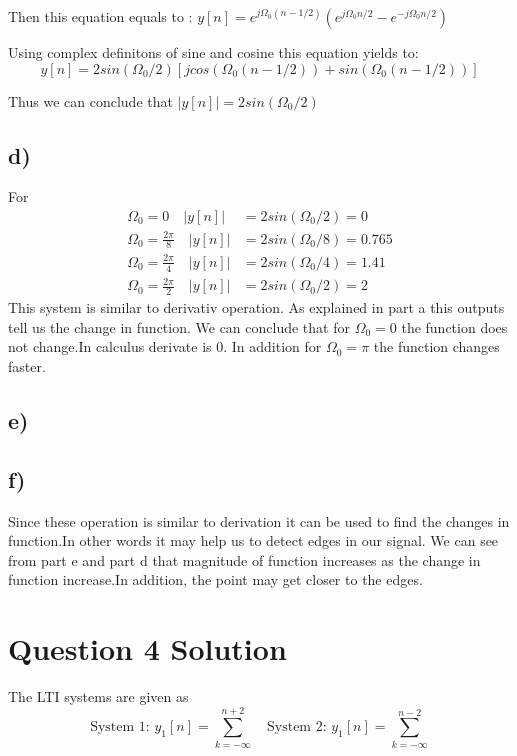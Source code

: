 \documentclass[letterpaper,12pt]{article}
\begin{document}
 Then this equation equals to : \(y[n]= e^{j \Omega_0 (n-1/2)}(e^{j \Omega_0 n/2}-e^{-j \Omega_0 n/2})\)

 Using complex definitons of sine and cosine this equation yields to: \[y[n]= 2sin(\Omega_0 /2)[jcos(\Omega_0 (n-1/2))+sin(\Omega_0 (n-1/2))]\]

 Thus we can conclude that $|y[n]|= 2sin(\Omega_0 /2)$

\subsection{d)}

For \begin{equation}
    \begin{split}
        \Omega_0 = 0 \quad |y[n]|&= 2sin(\Omega_0 /2)=0\\
 \Omega_0 = \frac{2\pi}{8} \quad |y[n]|&= 2sin(\Omega_0 /8)=0.765\\
 \Omega_0 = \frac{2\pi}{4} \quad |y[n]|&= 2sin(\Omega_0 /4)=1.41\\
 \Omega_0 = \frac{2\pi}{2} \quad |y[n]|&= 2sin(\Omega_0 /2)=2
    \end{split}
\end{equation}
This system is similar to derivativ operation. As explained in part a this outputs tell us the change in function. We can conclude that for \( \Omega_0 = 0\) the function does not change.In calculus derivate is 0. In addition for  \( \Omega_0 = \pi \) the function changes faster.
\subsection{e)}

\subsection{f)}
Since these operation is similar to derivation it can be used to find the changes in function.In other words it may help us to detect edges in our signal. We can see from part e and part d that magnitude of function increases as the change in function increase.In addition, the point may get closer to the edges.
\section{Question 4 Solution}
The LTI systems are given as 
\[
\text{System 1: }    y_1[n] = \sum_{k = -\infty}^{n +2} \quad  \text{System 2: }    y_1[n] = \sum_{k = -\infty}^{n-2}  
\]
\end{document}
